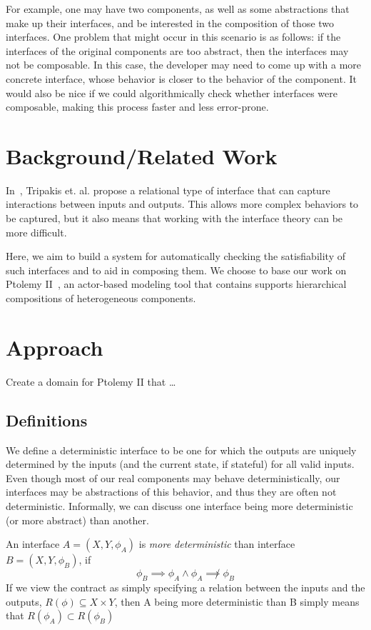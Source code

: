 \documentclass[preprint,11pt,authoryear]{sigplanconf}
\begin{document}
For example, one may have two components, as well as some abstractions that make up their interfaces, and be interested in the composition of those two interfaces.  One problem that might occur in this scenario is as follows: if the interfaces of the original components are too abstract, then the interfaces may not be composable.  In this case, the developer may need to come up with a more concrete interface, whose behavior is closer to the behavior of the component.  It would also be nice if we could algorithmically check whether interfaces were composable, making this process faster and less error-prone.

\section{Background/Related Work}
In~\cite{realationalInterfaces}, Tripakis et. al. propose a relational type of interface that can capture interactions between inputs and outputs.  This allows more complex behaviors to be captured, but it also means that working with the interface theory can be more difficult.

Here, we aim to build a system for automatically checking the satisfiability of such interfaces and to aid in composing them.  We choose to base our work on Ptolemy II~\cite{ptII}, an actor-based modeling tool that contains supports hierarchical compositions of heterogeneous components.

\section{Approach}
Create a domain for Ptolemy II that \dots

\subsection{Definitions}
We define a deterministic interface to be one for which the outputs are uniquely determined by the inputs (and the current state, if stateful) for all valid inputs.  Even though most of our real components may behave deterministically, our interfaces may be abstractions of this behavior, and thus they are often not deterministic.  Informally, we can discuss one interface being more deterministic (or more abstract) than another.

An interface $A=(X,Y,\phi_A)$ is \emph{more deterministic} than interface $B=(X,Y,\phi_B)$, if
\[
\phi_B \implies \phi_A \wedge \phi_A \not\implies \phi_B
\]
If we view the contract as simply specifying a relation between the inputs and the outputs, $R(\phi) \subseteq X \times Y$, then A being more deterministic than B simply means that
$R(\phi_A) \subset R(\phi_B)$
\end{document}
